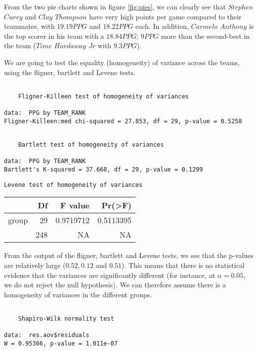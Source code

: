 \documentclass[
  12pt,
]{article}
\begin{document}
From the two pie charts shown in figure \ref{fig:pies}, we can clearly see that \(Stephen\) \(Curry\) and \(Clay\) \(Thompson\) have very high points per game compared to their teammates, with \(19.19 PPG\) and \(18.22 PPG\) each. In addition, \(Carmelo\) \(Anthony\) is the top scorer in his team with a \(18.84 PPG\); \(9 PPG\) more than the second-best in the team (\(Time\) \(Hardaway\) \(Jr\) with \(9.3 PPG\)).

We are going to test the equality (homogeneity) of variance across the teams, using the fligner, bartlett and Levene tests.

\begin{verbatim}

    Fligner-Killeen test of homogeneity of variances

data:  PPG by TEAM_RANK
Fligner-Killeen:med chi-squared = 27.853, df = 29, p-value = 0.5258
\end{verbatim}

\begin{verbatim}

    Bartlett test of homogeneity of variances

data:  PPG by TEAM_RANK
Bartlett's K-squared = 37.668, df = 29, p-value = 0.1299
\end{verbatim}

\begin{verbatim}
Levene test of homogeneity of variances
\end{verbatim}

\begin{tabular}{l|r|r|r}
\hline
  & Df & F value & Pr(>F)\\
\hline
group & 29 & 0.9719712 & 0.5113395\\
\hline
 & 248 & NA & NA\\
\hline
\end{tabular}

From the output of the fligner, bartlett and Levene tests, we see that the p-values are relatively large (\(0.52, 0.12\) and \(0.51\)). This means that there is no statistical evidence that the variances are significantly different (for instance, at \(\alpha=0.05\), we do not reject the null hypothesis). We can therefore assume there is a homogeneity of variances in the different groups.

\begin{verbatim}

    Shapiro-Wilk normality test

data:  res.aov$residuals
W = 0.95366, p-value = 1.011e-07
\end{verbatim}
\end{document}
